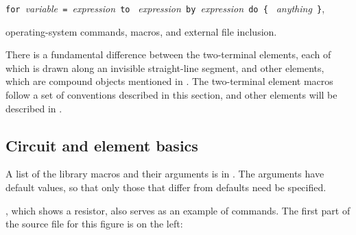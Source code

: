 \verb|for |{\sl variable}\verb| = |{\sl expression}\verb| to |%
{\sl expression}\verb| by |{\sl expression}\verb| do { |%
{\sl anything}\verb| }|,

\noindent%
operating-system commands, \pic macros, and external file inclusion.

There is a fundamental difference between the two-terminal elements, each
of which is drawn along an invisible straight-line segment,
and other elements, which are compound objects mentioned
in .
The two-terminal element macros follow a
set of conventions described in this section, and other elements will
be described in .

\subsection{Circuit and element basics\label{Basics:}}
A list of the library macros and their arguments is in
.  The arguments have default values, so that only
those that differ from defaults need be specified.

, which shows a resistor, also serves as
an example of \pic commands.
The first part of the source file for this figure is 
on the left:

